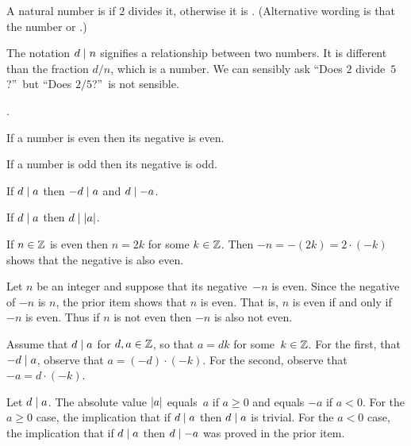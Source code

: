 \documentclass{ibl}
\begin{document}
\begin{df}
  A natural number is  if $2$ divides it,
  otherwise it is .
  (Alternative wording is that the number 
  or .)
\end{df}

The notation $d\mid n$ signifies a relationship between two numbers.
It is different than the fraction $d/n$, which is a number.
We can sensibly ask ``Does $2$ divide~$5$?''\
but ``Does $2/5$?''\ is not sensible.   

\begin{ex}
\pord.
\begin{exes}
\item If a number is even then its negative is even.
\item If a number is odd then its negative is odd.
\item If $d\mid a$ then $-d\mid a$ and $d\mid -a$.
\item If $d\mid a$ then $d\mid\lvert a\rvert$.
\end{exes}  
\begin{ans}
\begin{exes}
\item If $n\in\mathbb{Z}$ is even then $n=2k$ for some $k\in\mathbb{Z}$.
Then $-n=-(2k)=2\cdot(-k)$ shows that the negative is also even.
\item Let $n$ be an integer and suppose that its negative~$-n$ is even.
Since the negative of $-n$ is $n$, the prior item shows that $n$ is even.
That is, $n$ is even if and only if $-n$ is even.
Thus if $n$ is not even then $-n$ is also not even.
\item Assume that $d\mid a$ for $d,a\in\mathbb{Z}$, so that 
$a=dk$ for some~$k\in\mathbb{Z}$.
For the first, that $-d\mid a$, observe that
$a=(-d)\cdot(-k)$.
For the second, observe that $-a=d\cdot(-k)$.
\item Let $d\mid a$.
The absolute value $\lvert a\rvert$ equals~$a$ if $a\geq 0$ and equals
$-a$ if $a<0$.
For the $a\geq 0$ case, the implication that if $d\mid a$ then $d\mid a$
is trivial.
For the $a<0$ case, 
the implication that if $d\mid a$ then $d\mid -a$ was
proved in the prior item.
\end{exes}
\end{ans}
\end{ex}
\end{document}
